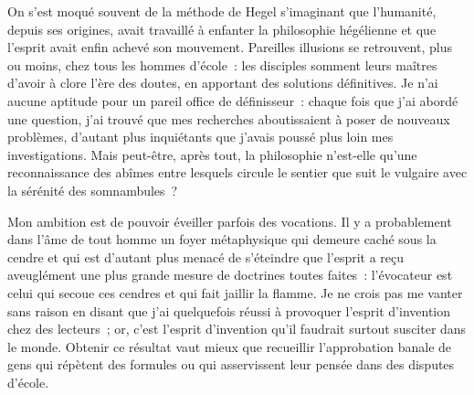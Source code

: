 \documentclass[french,twoside]{book} %
\begin{document}
On s’est moqué souvent de la méthode de Hegel s’imaginant que l’humanité, depuis ses origines, avait travaillé à enfanter la philosophie hégélienne et que l’esprit avait enfin achevé son mouvement. Pareilles illusions se retrouvent, plus ou moins, chez tous les hommes d’école : les disciples somment leurs maîtres d’avoir à clore l’ère des doutes, en apportant des solutions définitives. Je n’ai aucune aptitude pour un pareil office de définisseur : chaque fois que j’ai abordé une question, j’ai trouvé que mes recherches aboutissaient à poser de nouveaux problèmes, d’autant plus inquiétants que j’avais poussé plus loin mes investigations. Mais peut-être, après tout, la philosophie n’est-elle qu’une reconnaissance des abîmes entre lesquels circule le sentier que suit le vulgaire avec la sérénité des somnambules ?\par
Mon ambition est de pouvoir éveiller parfois des vocations. Il y a probablement dans l’âme de tout homme un foyer métaphysique qui demeure caché sous la cendre et qui est d’autant plus menacé de s’éteindre que l’esprit a reçu aveuglément une plus grande mesure de doctrines  toutes faites : l’évocateur est celui qui secoue ces cendres et qui fait jaillir la flamme. Je ne crois pas me vanter sans raison en disant que j’ai quelquefois réussi à provoquer l’esprit d’invention chez des lecteurs ; or, c’est l’esprit d’invention qu’il faudrait surtout susciter dans le monde. Obtenir ce résultat vaut mieux que recueillir l’approbation banale de gens qui répètent des formules ou qui asservissent leur pensée dans des disputes d’école.\par
\end{document}
